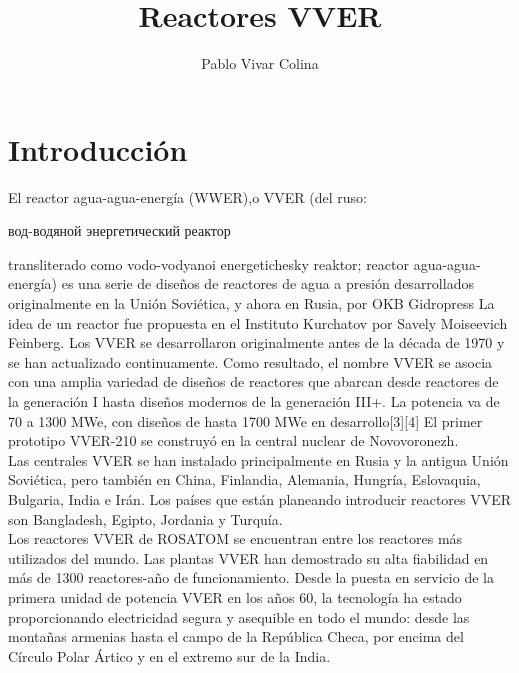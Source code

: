 \documentclass[]{article}
\title{Reactores VVER}
\author{Pablo Vivar Colina}
\begin{document}
	

\maketitle

\tableofcontents  %

\listoffigures  %


\section{Introducción}


El reactor agua-agua-energía (WWER),o VVER (del ruso: 


вод-водяной энергетический реактор


transliterado como vodo-vodyanoi energetichesky reaktor; reactor agua-agua-energía) es una serie de diseños de reactores de agua a presión desarrollados originalmente en la Unión Soviética, y ahora en Rusia, por OKB Gidropress La idea de un reactor fue propuesta en el Instituto Kurchatov por Savely Moiseevich Feinberg. Los VVER se desarrollaron originalmente antes de la década de 1970 y se han actualizado continuamente. Como resultado, el nombre VVER se asocia con una amplia variedad de diseños de reactores que abarcan desde reactores de la generación I hasta diseños modernos de la generación III+. La potencia va de 70 a 1300 MWe, con diseños de hasta 1700 MWe en desarrollo[3][4] El primer prototipo VVER-210 se construyó en la central nuclear de Novovoronezh.\\

Las centrales VVER se han instalado principalmente en Rusia y la antigua Unión Soviética, pero también en China, Finlandia, Alemania, Hungría, Eslovaquia, Bulgaria, India e Irán. Los países que están planeando introducir reactores VVER son Bangladesh, Egipto, Jordania y Turquía.\citep{BaezaG.2009}\\

Los reactores VVER de ROSATOM se encuentran entre los reactores más utilizados del mundo. Las plantas VVER han demostrado su alta fiabilidad en más de 1300 reactores-año de funcionamiento. Desde la puesta en servicio de la primera unidad de potencia VVER en los años 60, la tecnología ha estado proporcionando electricidad segura y asequible en todo el mundo: desde las montañas armenias hasta el campo de la República Checa, por encima del Círculo Polar Ártico y en el extremo sur de la India.\citep{Rosatom}\\
\end{document}
